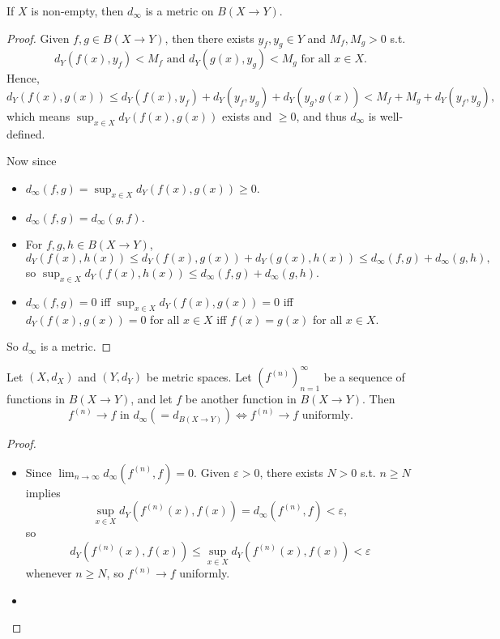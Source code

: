 \begin{proposition}
    If \(X\) is non-empty, then \(d_\infty \) is a metric on \(B(X \to Y)\).  
\end{proposition}
\begin{proof}
    Given \(f, g \in B(X \to Y)\), then there exists \(y_f, y_g \in Y\) and \(M_f, M_g > 0\) s.t.
    \[
        d_Y (f(x), y_f) < M_f \text{ and } d_Y (g(x), y_g) < M_g \text{ for all } x \in X. 
    \]  
    Hence, 
    \[
        d_Y (f(x), g(x)) \le d_Y (f(x), y_f) + d_Y(y_f, y_g) + d_Y(y_g, g(x)) < M_f + M_g + d_Y(y_f, y_g),
    \] which means \(\sup _{x \in X} d_Y(f(x), g(x))\) exists and \(\ge 0\), and thus \(d_\infty \) is well-defined.  
    
    Now since 
    \begin{itemize}
        \item [(1)] \(d_\infty (f, g) = \sup _{x \in X} d_Y (f(x), g(x))\ge 0\). 
        \item [(2)] \(d_\infty (f, g) = d_\infty (g, f)\). 
        \item [(3)] For \(f, g, h \in B(X \to Y)\), 
        \[
            d_Y (f(x), h(x)) \le d_Y(f(x), g(x)) + d_Y (g(x), h(x)) \le d_\infty (f, g) + d_\infty (g, h),
        \]
        so \(\sup _{x \in X} d_Y(f(x), h(x)) \le d_\infty (f, g) + d_\infty (g, h)\). 
        \item [(4)] \(d_\infty (f, g) = 0\) iff \(\sup _{x \in X} d_Y (f(x), g(x)) = 0\) iff \(d_Y(f(x), g(x)) = 0\) for all \(x \in X\) iff \(f(x) = g(x)\) for all \(x \in X\).       
    \end{itemize}
    So \(d_\infty \) is a metric. 
\end{proof}

\begin{proposition} \label{prop: on doo converge iff uniformly convergent}
    Let \((X, d_X)\) and \((Y, d_Y)\) be metric spaces. Let \(\left( f^{(n)} \right)_{n=1}^{\infty}  \) be a sequence of functions in \(B(X \to Y)\), and let \(f\) be another function in \(B(X \to Y)\). Then      
    \[
        f^{(n)} \to f \text{ in } d_\infty ( = d_{B(X \to Y)}) \iff f^{(n)} \to f \text{ uniformly}.  
    \]
\end{proposition}
\begin{proof}
    \vphantom{text}
    \begin{itemize}
        \item [\((\implies )\)] Since \(\lim_{n \to \infty} d_\infty \left( f^{(n)}, f \right) = 0  \). Given \(\varepsilon > 0\), there exists \(N > 0\) s.t. \(n \ge N\) implies 
        \[
            \sup _{x \in X} d_Y\left( f^{(n)}(x), f(x) \right)  = d_\infty \left( f^{(n)}, f \right) < \varepsilon,
        \] so 
        \[
            d_Y \left( f^{(n)}(x), f(x) \right) \le \sup _{x \in X} d_Y\left( f^{(n)}(x), f(x) \right) < \varepsilon 
        \] whenever \(n \ge N\), so \(f^{(n)} \to f\) uniformly.  
        \item [\((\impliedby )\)] 
    \end{itemize}
\end{proof}

